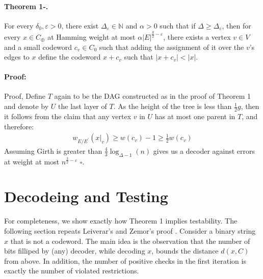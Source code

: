 \documentclass{article}
\begin{document}
\begin{multicols*}{2}
\paragraph{Theorem 1-.} For every $\delta_{0}, \varepsilon > 0$, there exist $\Delta_{\varepsilon}\in \mathbb{N}$ and $\alpha>0$ such that if $\Delta \ge \Delta_{\varepsilon}$, then for every $x \in C_{\oplus}$ at Hamming weight at most $\alpha |E|^{\frac{g}{2}-\varepsilon}$, there exists a vertex $v \in V$ and a small codeword $c_{v} \in C_{0} $ such that adding the assignment of it over the $v$'s edges to $x$ define the codeword $x + c_{v}$  such that $|x + c_{v}| < |x|$.  
\paragraph{Proof:} Proof,  Define $T$ again to be the DAG constructed as in the proof of Theorem 1 and denote by $U$ the last layer of $T$. As the height of the tree is less than $\frac{1}{2}g$, then it follows from the claim that any vertex $v$ in $U$ has at most one parent in $T$, and therefore:    
\begin{equation*}
  \begin{split}
    w_{E/E^{\prime}}\left( x|_{v} \right) \ge w(c_{v}) - 1 \ge \frac{1}{2}w(c_{v})
  \end{split}
\end{equation*}
Assuming Girth is greater than $\frac{4}{3}\log_{\Delta-1}\left( n \right)$  gives us a decoder against errors at weight at most $n^{\frac{3}{2}-\varepsilon}$ $\square$. 

\section{Decodeing and Testing}
For completeness, we show exactly how Theorem 1 implies testability. The following section repeats Leiverar's and Zemor's proof \cite{leverrier2022quantum}. Consider a binary string $x$ that is not a codeword. The main idea is the observation that the number of bits filliped by (any) decoder, while decoding $x$, bounds the distance $d\left( x,C \right)$ from above. In addition, the number of positive checks in the first iteration is exactly the number of violated restrictions.

\end{multicols*}
\end{document}
